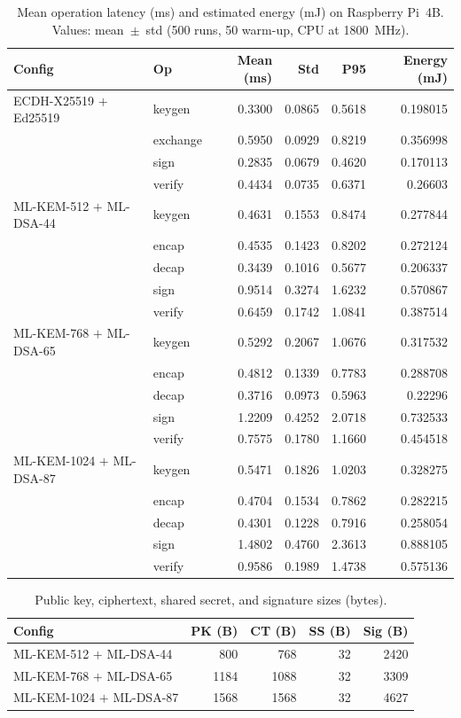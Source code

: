 \begin{table}[t]\centering
\caption{Mean operation latency (ms) and estimated energy (mJ) on
Raspberry Pi~4B. Values: mean~$\pm$~std (500 runs, 50 warm-up, CPU at 1800~MHz).}
\label{tab:latency}
\begin{tabular}{llrrrr}
\hline
Config & Op & Mean (ms) & Std & P95 & Energy (mJ) \\
\hline
ECDH-X25519 $+$ Ed25519 & keygen & 0.3300 & 0.0865 & 0.5618 & 0.198015 \\
 & exchange & 0.5950 & 0.0929 & 0.8219 & 0.356998 \\
 & sign & 0.2835 & 0.0679 & 0.4620 & 0.170113 \\
 & verify & 0.4434 & 0.0735 & 0.6371 & 0.26603 \\
\hline
ML-KEM-512 $+$ ML-DSA-44 & keygen & 0.4631 & 0.1553 & 0.8474 & 0.277844 \\
 & encap & 0.4535 & 0.1423 & 0.8202 & 0.272124 \\
 & decap & 0.3439 & 0.1016 & 0.5677 & 0.206337 \\
 & sign & 0.9514 & 0.3274 & 1.6232 & 0.570867 \\
 & verify & 0.6459 & 0.1742 & 1.0841 & 0.387514 \\
\hline
ML-KEM-768 $+$ ML-DSA-65 & keygen & 0.5292 & 0.2067 & 1.0676 & 0.317532 \\
 & encap & 0.4812 & 0.1339 & 0.7783 & 0.288708 \\
 & decap & 0.3716 & 0.0973 & 0.5963 & 0.22296 \\
 & sign & 1.2209 & 0.4252 & 2.0718 & 0.732533 \\
 & verify & 0.7575 & 0.1780 & 1.1660 & 0.454518 \\
\hline
ML-KEM-1024 $+$ ML-DSA-87 & keygen & 0.5471 & 0.1826 & 1.0203 & 0.328275 \\
 & encap & 0.4704 & 0.1534 & 0.7862 & 0.282215 \\
 & decap & 0.4301 & 0.1228 & 0.7916 & 0.258054 \\
 & sign & 1.4802 & 0.4760 & 2.3613 & 0.888105 \\
 & verify & 0.9586 & 0.1989 & 1.4738 & 0.575136 \\
\hline
\end{tabular}\end{table}

\begin{table}[t]\centering
\caption{Public key, ciphertext, shared secret, and signature sizes (bytes).}
\label{tab:sizes}
\begin{tabular}{lrrrr}
\hline
Config & PK (B) & CT (B) & SS (B) & Sig (B) \\
\hline
ML-KEM-512 $+$ ML-DSA-44 & 800 & 768 & 32 & 2420 \\
ML-KEM-768 $+$ ML-DSA-65 & 1184 & 1088 & 32 & 3309 \\
ML-KEM-1024 $+$ ML-DSA-87 & 1568 & 1568 & 32 & 4627 \\
\hline
\end{tabular}\end{table}

